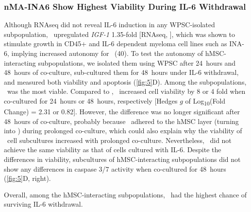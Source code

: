 \subsubsection*{nMA-INA6 Show Highest Viability During IL-6 Withdrawal}%
\label{C1:results:RNAseq:viability}%
Although RNAseq did not reveal IL-6 induction in any WPSC-isolated
subpopulation, \nMAina\ upregulated \textit{IGF-1} 1.35-fold [RNAseq,
], which was shown to stimulate growth in CD45+ and IL-6
dependent myeloma cell lines such as INA-6, implying increased autonomy for
\nMAina\ (40). To test the autonomy of hMSC-interacting \INA subpopulations, we
isolated them using WPSC after \SI{24}{hours} and \SI{48}{hours} of co-culture,
sub-cultured them for \SI{48}{hours} under IL-6 withdrawal, and measured both
viability and apoptosis (\autoref{fig:5}D). Among the subpopulations, \nMAina\
was the most viable. Compared to \MAina, \nMAina\ increased cell viability by 8
or 4 fold when co-cultured for \SI{24}{hours} or \SI{48}{hours}, respectively
    [Hedges $g$ of Log\textsubscript{10}(Fold Change) = 2.31 or 0.82]. However, the
difference was no longer significant after \SI{48}{hours} of co-culture,
probably because \nMAina\ adhered to the hMSC layer (turning into \MAina) during
prolonged co-culture, which could also explain why the viability of \MAina\ cell
subcultures increased with prolonged co-culture. Nevertheless, \nMAina\ did not
achieve the same viability as that of \INA cells cultured with IL-6. Despite the
differences in viability, subcultures of hMSC-interacting subpopulations did not
show any differences in caspase 3/7 activity when co-cultured for \SI{48}{hours}
(\autoref{fig:5}D, right).

Overall, among the hMSC-interacting subpopulations, \nMAina\ had the highest
chance of surviving IL-6 withdrawal.



